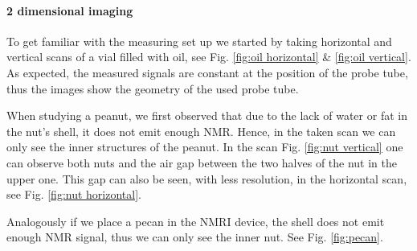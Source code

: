\paragraph{2 dimensional imaging}
To get familiar with the measuring set up we started by taking horizontal and vertical scans of a vial filled with oil, see Fig. \ref{fig:oil horizontal} \& \ref{fig:oil vertical}. As expected, the measured signals are constant at the position of the probe tube, thus the images show the geometry of the used probe tube. 

When studying a peanut, we first observed that due to the lack of water or fat in the nut's shell, it does not emit enough NMR. Hence, in the taken scan we can only see the inner structures of the peanut. In the scan Fig. \ref{fig:nut vertical} one can observe both nuts and the air gap between the two halves of the nut in the upper one. This gap can also be seen, with less resolution, in the horizontal scan, see Fig. \ref{fig:nut horizontal}.

Analogously if we place a pecan in the NMRI device, the shell does not emit enough NMR signal, thus we can only see the inner nut. See Fig. \ref{fig:pecan}. 

